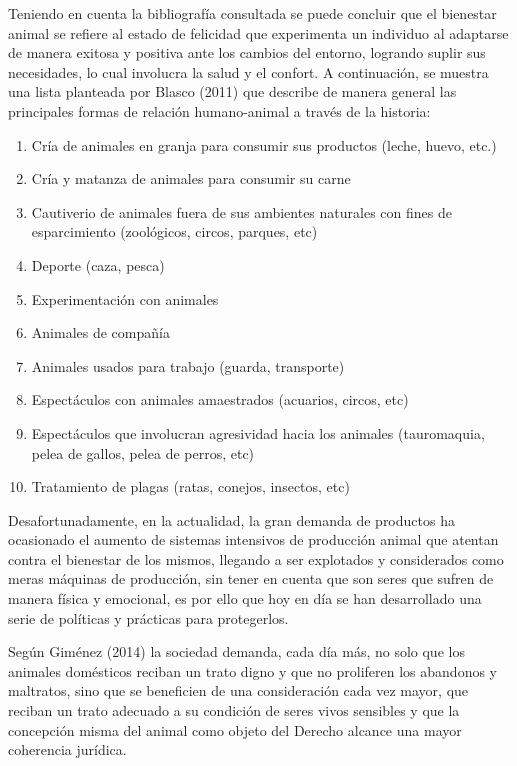 Teniendo en cuenta la bibliografía consultada se puede concluir que el bienestar animal se refiere al estado de felicidad que experimenta un individuo al adaptarse de manera exitosa y positiva ante los cambios del entorno, logrando suplir sus necesidades, lo cual involucra la salud y el confort. 
A continuación, se muestra una lista planteada por Blasco (2011)  que
describe de manera general las principales formas de relación 
humano-animal a través de la historia:
\begin{enumerate}
	\item Cría de animales en granja para consumir sus productos (leche, huevo, etc.)
\item  Cría y matanza de animales para consumir su carne
\item  Cautiverio de animales fuera de sus ambientes naturales con fines de esparcimiento (zoológicos, circos, parques, etc)
\item  Deporte (caza, pesca)
\item  Experimentación con animales
\item  Animales de compañía
\item  Animales usados para trabajo (guarda, transporte)
\item  Espectáculos con animales amaestrados (acuarios, circos, etc)
\item  Espectáculos que involucran agresividad hacia los animales (tauromaquia, pelea de gallos, pelea de perros, etc)
\item  Tratamiento de plagas (ratas, conejos, insectos, etc)

\end{enumerate}
Desafortunadamente, en la actualidad, la gran demanda de productos ha ocasionado el aumento de sistemas intensivos de producción animal que atentan contra el bienestar de los mismos, llegando a ser explotados y considerados como meras máquinas de producción, sin tener en cuenta que son seres que sufren de manera física y emocional, es por ello que hoy en día se han desarrollado una serie de políticas y prácticas para protegerlos. 

Según Giménez (2014)  la sociedad demanda, cada día más, no solo que los animales domésticos reciban un trato digno y que no proliferen los abandonos y maltratos, sino que se beneficien de una consideración cada vez mayor, que reciban un trato adecuado a su condición de seres vivos sensibles y que la concepción misma del animal como objeto del Derecho alcance una mayor coherencia jurídica.  

